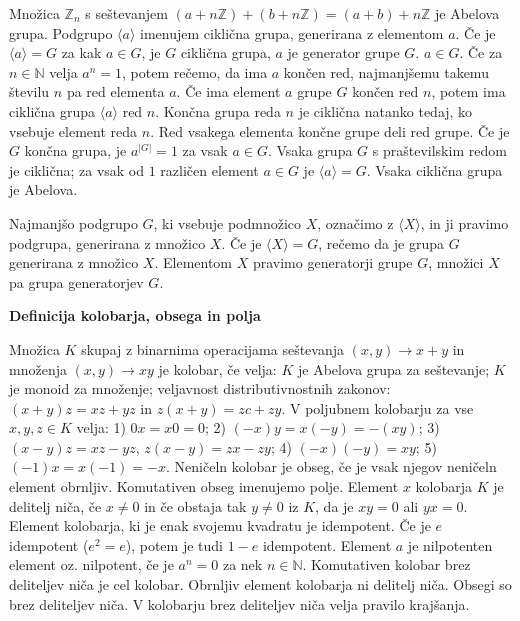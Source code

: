 \documentclass[10pt]{extarticle}
\begin{document}
        
             Množica $\mathbb{Z}_n$ s seštevanjem $(a+n\mathbb{Z})+(b+n\mathbb{Z})=(a+b)+n\mathbb{Z}$ je Abelova grupa.
             Podgrupo $\langle a\rangle$ imenujem ciklična grupa, generirana z elementom $a$. Če je  $\langle a\rangle=G$ za kak $a\in G$, je $G$ ciklična grupa, $a$ je generator grupe $G$.
             $a\in G$. Če za $n\in \mathbb{N}$ velja $a^n=1$, potem rečemo, da ima $a$ končen red, najmanjšemu takemu številu $n$ pa red elementa $a$.
             Če ima element $a$ grupe $G$ končen red $n$, potem ima ciklična grupa $\langle a\rangle$ red $n$.
             Končna grupa reda $n$ je ciklična natanko tedaj, ko vsebuje element reda $n$.
             Red vsakega elementa končne grupe deli red grupe.
             Če je $G$ končna grupa, je $a^{|G|}=1$ za vsak $a\in G$.
             Vsaka grupa $G$ s praštevilskim redom je ciklična; za vsak od $1$ različen element $a\in G$ je $\langle a\rangle=G$.
             Vsaka ciklična grupa je Abelova.
        
             Najmanjšo podgrupo $G$, ki vsebuje podmnožico $X$, označimo z $\langle X \rangle$, in ji pravimo podgrupa, generirana z množico $X$.
             Če je $\langle X \rangle = G$, rečemo da je grupa $G$ generirana z množico $X$. Elementom $X$ pravimo generatorji grupe $G$, množici $X$ pa grupa generatorjev $G$.




    \textbf{Definicija kolobarja, obsega in polja}

        
             Množica $K$ skupaj z binarnima operacijama seštevanja $(x,y)\to x+y$ in množenja $(x,y)\to xy$ je kolobar, če velja: $K$ je Abelova grupa za seštevanje; $K$ je monoid za množenje; veljavnost distributivnostnih zakonov: $(x+y)z=xz+yz$ in $z(x+y)=zc+zy$.
             V poljubnem kolobarju za vse $x,y,z\in K$ velja: 1) $0x=x0=0$; 2) $(-x)y=x(-y)=-(xy)$; 3) $(x-y)z=xz-yz$, $z(x-y)=zx-zy$; 4) $(-x)(-y)=xy$; 5) $(-1)x=x(-1)=-x$. 
             Neničeln kolobar je obseg, če je vsak njegov neničeln element obrnljiv. Komutativen obseg imenujemo polje.
             Element $x$ kolobarja $K$ je delitelj niča, če $x\neq 0$ in če obstaja tak $y\neq 0$ iz $K$, da je $xy=0$ ali $yx=0$.
             Element kolobarja, ki je enak svojemu kvadratu je idempotent. Če je $e$ idempotent ($e^2=e$), potem je tudi $1-e$ idempotent.
             Element $a$ je nilpotenten element oz. nilpotent, če je $a^n=0$ za nek $n\in\mathbb{N}$.
             Komutativen kolobar brez deliteljev niča je cel kolobar.
             Obrnljiv element kolobarja ni delitelj niča. Obsegi so brez deliteljev niča.
             V kolobarju brez deliteljev niča velja pravilo krajšanja.
\end{document}
